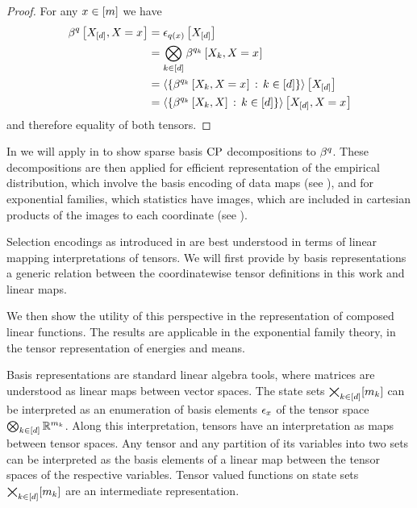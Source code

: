 \begin{proof}
    For any $x\in[m]$ we have
    \begin{align*}
        \beta^{q}\left[X_{[d]},X_{}=x_{}\right]
        &= \epsilon_{q(x)}\left[X_{[d]}\right] \\
        &= \bigotimes_{k\in[d]} \beta^{q_{k}}\left[X_{k},X_{}=x_{}\right] \\
        &= \left\langle 
            \{\beta^{q_{k}}\left[X_{k},X_{}=x_{}\right] \,:\, k\in[d]\}
        \right\rangle \left[ X_{[d]} \right] \\
        &= \left\langle 
            \{\beta^{q_{k}}\left[X_{k},X\right] \,:\, k\in[d]\}
        \right\rangle \left[ X_{[d]},X_{}=x_{} \right]
    \end{align*}
    and therefore equality of both tensors.
\end{proof}

In  we will apply  in  to show sparse basis $\mathrm{CP}$ decompositions to $\beta^{q}$.
These decompositions are then applied for efficient representation of the empirical distribution, which involve the basis encoding of data maps (see ), and for exponential families, which statistics have images, which are included in cartesian products of the images to each coordinate (see ).




Selection encodings as introduced in  are best understood in terms of linear mapping interpretations of tensors.
We will first provide by basis representations a generic relation between the coordinatewise tensor definitions in this work and linear maps.

We then show the utility of this perspective in the representation of composed linear functions.
The results are applicable in the exponential family theory, in the tensor representation of energies and means.


Basis representations are standard linear algebra tools, where matrices are understood as linear maps between vector spaces.
The state sets $\bigtimes_{k\in[d]}[m_{k}]$ can be interpreted as an enumeration of basis elements $\epsilon_{x}$ of the tensor space $\bigotimes_{k\in[d]} \mathbb{R}^{m_{k}}$.
Along this interpretation, tensors have an interpretation as maps between tensor spaces.
Any tensor and any partition of its variables into two sets can be interpreted as the basis elements of a linear map between the tensor spaces of the respective variables.
Tensor valued functions on state sets $\bigtimes_{k\in[d]}[m_{k}]$ are an intermediate representation.

